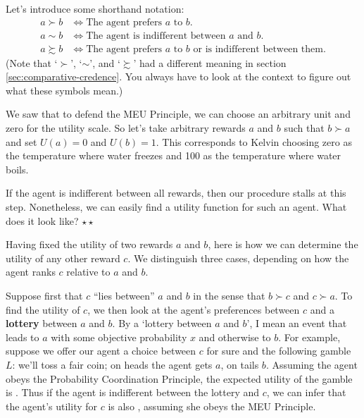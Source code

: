 Let's introduce some shorthand notation:
%
\begin{align*}
  a \succ b &\Leftrightarrow \text{The agent prefers $a$ to $b$}.\\
  a \sim b &\Leftrightarrow \text{The agent is indifferent between $a$ and $b$.}\\
  a \succsim b & \Leftrightarrow \text{The agent prefers $a$ to $b$ or is indifferent between them.}
\end{align*}
%
(Note that `$\succ$', `$\sim$', and `$\succsim$' had a different
meaning in section \ref{sec:comparative-credence}. You always have to
look at the context to figure out what these symbols mean.)

We saw that to defend the MEU Principle, we can choose an arbitrary
unit and zero for the utility scale. So let's take arbitrary rewards
$a$ and $b$ such that $b \succ a$ and set $U(a) = 0$ and $U(b) =
1$. This corresponds to Kelvin choosing zero as the temperature where
water freezes and 100 as the temperature where water boils. 

\begin{exercise}
  If the agent is indifferent between all rewards, then our procedure
  stalls at this step. Nonetheless, we can easily find a utility
  function for such an agent. What does it look like? $\star \star$
\end{exercise}

Having fixed the utility of two rewards $a$ and $b$, here is how we
can determine the utility of any other reward $c$. We distinguish
three cases, depending on how the agent ranks $c$ relative to $a$ and
$b$.

Suppose first that $c$ ``lies between'' $a$ and $b$ in the sense that
$b \succ c$ and $c \succ a$.  To find the utility of $c$, we then look
at the agent's preferences between $c$ and a \textbf{lottery} between
$a$ and $b$. By a `lottery between $a$ and $b$', I mean an event that
leads to $a$ with some objective probability $x$ and otherwise to
$b$. For example, suppose we offer our agent a choice between $c$ for
sure and the following gamble $L$: we'll toss a fair coin; on heads
the agent gets $a$, on tails $b$. Assuming the agent obeys the
Probability Coordination Principle, the expected utility of the gamble
is%
\cmnt{%
\[
  EU(L) = \nicefrac{1}{2} \cdot U(a) + \nicefrac{1}{2} \cdot U(b) =  
   \nicefrac{1}{2} \cdot 0 + \nicefrac{1}{2} \cdot 1 = \nicefrac{1}{2}. 
\]
} %
. Thus if the agent is indifferent between the lottery
and $c$, we can infer that the agent's utility for $c$ is also
, assuming she obeys the MEU Principle.

